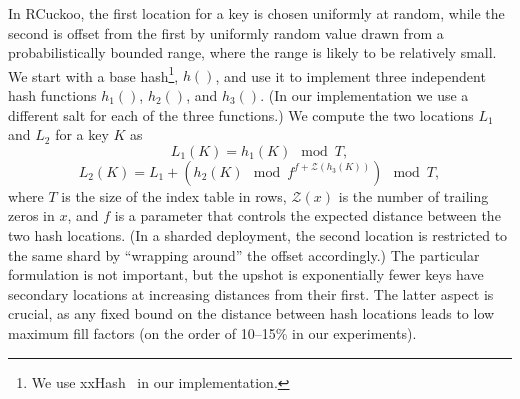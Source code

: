 \label{sec:dephash}







In RCuckoo, the first location for a key is chosen uniformly at random,
while the second is offset from the first by 
uniformly random value drawn from a probabilistically bounded range, where the
range is likely to be relatively small.  We start with a base
hash\footnote{We use xxHash~\cite{xxhash} in our implementation.},
$h()$, and use it to implement three independent hash functions
$h_1()$, $h_2()$, and $h_3()$.  (In our implementation we use a
different salt for each of the three functions.)  We compute the two
locations $L_1$ and $L_2$ for a key $K$ as
\[ L_1(K) = h_1(K)\mod T, \]
\[ L_2(K) = L_1 + (h_2(K)\mod f^{f+\mathcal{Z}(h_3(K))})\mod T, \]
\noindent where $T$ is the size of the index table in rows,
$\mathcal{Z}(x)$ is the number of trailing zeros in $x$, and $f$ is a
parameter that controls the expected distance between the two hash
locations.  (In a sharded deployment, the second location is
restricted to the same shard by ``wrapping around'' the offset
accordingly.) The particular formulation is not important, but the
upshot is exponentially fewer keys have secondary locations at
increasing distances from their first.  The latter aspect is crucial, as any
fixed bound on the distance between hash locations leads to low
maximum fill factors (on the order of 10--15\% in our experiments).

